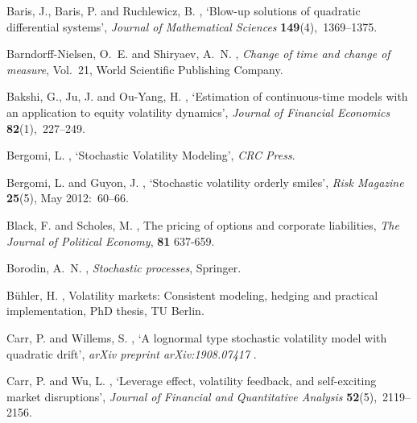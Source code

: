 \documentclass[pdftex,11pt,a4paper] {article}
\begin{document}
\begin{thebibliography}{}
Baris, J., Baris, P. and Ruchlewicz, B.  \harvardyearright , `Blow-up solutions of quadratic differential
  systems', {\em Journal of Mathematical Sciences} {\bf 149}(4),~1369--1375.

 Barndorff-Nielsen, O.~E. and Shiryaev, A.~N.  \harvardyearright , {\em Change of time and change of measure}, Vol.~21,
  World Scientific Publishing Company.

Bakshi, G., Ju, J. and Ou-Yang, H.  \harvardyearright , `Estimation of continuous-time models with an application to equity volatility dynamics', {\em Journal of Financial Economics} {\bf 82}(1),~227--249.

Bergomi, L.  \harvardyearright , `Stochastic Volatility Modeling', {\em
  CRC Press}.

Bergomi, L. and Guyon, J.  \harvardyearright , `Stochastic volatility orderly smiles', {\em Risk Magazine}  {\bf 25}(5), May 2012:~60--66. 

Black, F. and Scholes, M.  \harvardyearright ,
  The pricing of options and corporate liabilities, {\em The Journal of Political Economy}, {\bf
  81} 637-659.

Borodin, A.~N.  \harvardyearright , {\em Stochastic
  processes}, Springer.


B{\"u}hler, H.  \harvardyearright , Volatility markets:
  Consistent modeling, hedging and practical implementation, PhD thesis, TU
  Berlin.


Carr, P. and Willems, S.  \harvardyearright , `A
  lognormal type stochastic volatility model with quadratic drift', {\em arXiv
  preprint arXiv:1908.07417} .

Carr, P. and Wu, L.  \harvardyearright ,
  `Leverage effect, volatility feedback, and self-exciting market disruptions',
  {\em Journal of Financial and Quantitative Analysis} {\bf 52}(5),~2119--2156.


\end{thebibliography}
\end{document}
